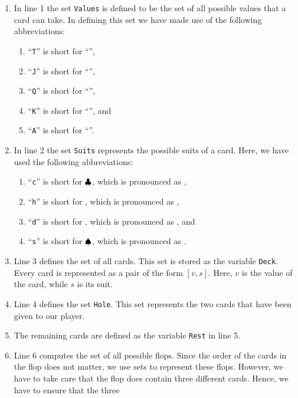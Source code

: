 \begin{enumerate}
\item In line 1 the set \texttt{Values} is defined to be the set of all possible values that a card
      can take.  In defining this set we have made use of the following abbreviations:
      \begin{enumerate}
      \item ``\texttt{T}'' is short for ``'',
      \item ``\texttt{J}'' is short for ``'',
      \item ``\texttt{Q}'' is short for ``'',
      \item ``\texttt{K}'' is short for ``'', and
      \item ``\texttt{A}'' is short for ``''.
      \end{enumerate}
\item In line 2 the set \texttt{Suits} represents the possible suits of a card.  Here, we have used
      the following abbreviations:
      \begin{enumerate}
      \item ``\texttt{c}'' is short for $\clubsuit $, which is pronounced as ,
      \item ``\texttt{h}'' is short for \mbox{\color{red}{$\heart$}}, which is pronounced as , 
      \item ``\texttt{d}'' is short for \mbox{\color{red}{$\diamondsuit$}}, which is pronounced as , and 
      \item ``\texttt{s}'' is short for $\spadesuit $, which is pronounced as . 
      \end{enumerate} 
\item Line 3 defines the set of all cards.  This set is stored as the variable \texttt{Deck}.  Every
      card is represented as a pair of the form $[v,s]$. Here, $v$ is the value of the card, while $s$ is its suit.
\item Line 4 defines the set \texttt{Hole}.  This set represents the two cards that have been given to our player.
\item The remaining cards are defined as the variable  \texttt{Rest} in line 5.
\item Line 6 computes the set of all possible flops.  Since the order of the cards in the flop does
      not matter, we use sets to represent these flops.  However, we have to take care that the flop
      does contain three \colorbox{amethyst}{different} cards.  Hence, we have to ensure that the three

\end{enumerate}
